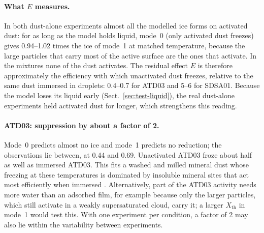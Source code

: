 \paragraph{What $E$ measures.} In both dust-alone experiments almost all the modelled ice forms on activated dust: for as long as the model holds liquid, mode~0 (only activated dust freezes) gives 0.94--1.02 times the ice of mode~1 at matched temperature, because the large particles that carry most of the active surface are the ones that activate. In the mixtures none of the dust activates. The residual effect $E$ is therefore approximately the efficiency with which unactivated dust freezes, relative to the same dust immersed in droplets: 0.4--0.7 for ATD03 and 5--6 for SDSA01. Because the model loses its liquid early (Sect.~\ref{sec:test-liquid}), the real dust-alone experiments held activated dust for longer, which strengthens this reading.

\paragraph{ATD03: suppression by about a factor of 2.} Mode~0 predicts almost no ice and mode~1 predicts no reduction; the observations lie between, at 0.44 and 0.69. Unactivated ATD03 froze about half as well as immersed ATD03. This fits a washed and milled mineral dust whose freezing at these temperatures is dominated by insoluble mineral sites that act most efficiently when immersed . Alternatively, part of the ATD03 activity needs more water than an adsorbed film, for example because only the larger particles, which still activate in a weakly supersaturated cloud, carry it; a larger $X_\mathrm{th}$ in mode~1 would test this. With one experiment per condition, a factor of 2 may also lie within the variability between experiments.

